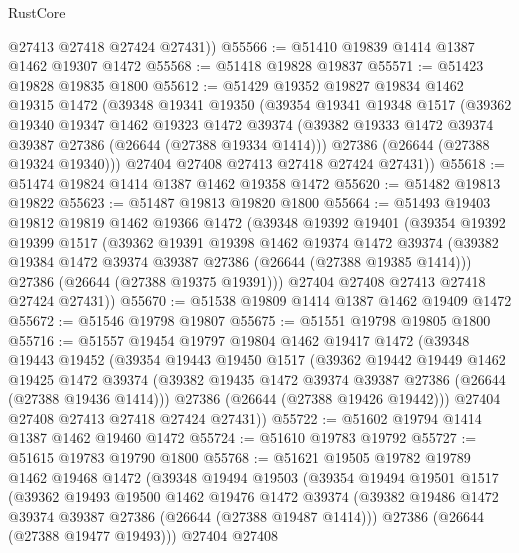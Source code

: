 \begin{lexlean}{RustCore}
\begin{coremodule}
        @27413
        @27418
        @27424
        @27431))
@55566 := @51410 @19839 @1414 @1387 @1462 @19307 @1472
@55568 := @51418 @19828 @19837
@55571 := @51423 @19828 @19835 @1800
@55612 := @51429
    @19352
    @19827
    @19834
    @1462
    @19315
    @1472
    (@39348
      @19341
      @19350
      (@39354
        @19341
        @19348
        @1517
        (@39362
          @19340
          @19347
          @1462
          @19323
          @1472
          @39374
          (@39382 @19333 @1472 @39374 @39387 @27386 (@26644 (@27388 @19334 @1414)))
          @27386
          (@26644 (@27388 @19324 @19340)))
        @27404
        @27408
        @27413
        @27418
        @27424
        @27431))
@55618 := @51474 @19824 @1414 @1387 @1462 @19358 @1472
@55620 := @51482 @19813 @19822
@55623 := @51487 @19813 @19820 @1800
@55664 := @51493
    @19403
    @19812
    @19819
    @1462
    @19366
    @1472
    (@39348
      @19392
      @19401
      (@39354
        @19392
        @19399
        @1517
        (@39362
          @19391
          @19398
          @1462
          @19374
          @1472
          @39374
          (@39382 @19384 @1472 @39374 @39387 @27386 (@26644 (@27388 @19385 @1414)))
          @27386
          (@26644 (@27388 @19375 @19391)))
        @27404
        @27408
        @27413
        @27418
        @27424
        @27431))
@55670 := @51538 @19809 @1414 @1387 @1462 @19409 @1472
@55672 := @51546 @19798 @19807
@55675 := @51551 @19798 @19805 @1800
@55716 := @51557
    @19454
    @19797
    @19804
    @1462
    @19417
    @1472
    (@39348
      @19443
      @19452
      (@39354
        @19443
        @19450
        @1517
        (@39362
          @19442
          @19449
          @1462
          @19425
          @1472
          @39374
          (@39382 @19435 @1472 @39374 @39387 @27386 (@26644 (@27388 @19436 @1414)))
          @27386
          (@26644 (@27388 @19426 @19442)))
        @27404
        @27408
        @27413
        @27418
        @27424
        @27431))
@55722 := @51602 @19794 @1414 @1387 @1462 @19460 @1472
@55724 := @51610 @19783 @19792
@55727 := @51615 @19783 @19790 @1800
@55768 := @51621
    @19505
    @19782
    @19789
    @1462
    @19468
    @1472
    (@39348
      @19494
      @19503
      (@39354
        @19494
        @19501
        @1517
        (@39362
          @19493
          @19500
          @1462
          @19476
          @1472
          @39374
          (@39382 @19486 @1472 @39374 @39387 @27386 (@26644 (@27388 @19487 @1414)))
          @27386
          (@26644 (@27388 @19477 @19493)))
        @27404
        @27408

\end{coremodule}
\end{lexlean}
